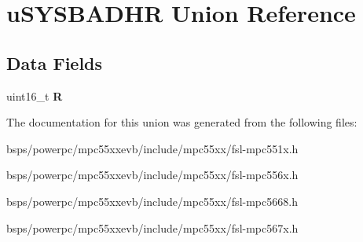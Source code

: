 \hypertarget{unionuSYSBADHR}{}\section{u\+S\+Y\+S\+B\+A\+D\+HR Union Reference}
\label{unionuSYSBADHR}
\subsection*{Data Fields}
\begin{DoxyCompactItemize}
\item 
\mbox{\label{unionuSYSBADHR_a69d4021a52468e3a05b10a9547989962}} 
uint16\+\_\+t {\bfseries R}
\end{DoxyCompactItemize}


The documentation for this union was generated from the following files\+:\begin{DoxyCompactItemize}
\item 
bsps/powerpc/mpc55xxevb/include/mpc55xx/fsl-\/mpc551x.\+h\item 
bsps/powerpc/mpc55xxevb/include/mpc55xx/fsl-\/mpc556x.\+h\item 
bsps/powerpc/mpc55xxevb/include/mpc55xx/fsl-\/mpc5668.\+h\item 
bsps/powerpc/mpc55xxevb/include/mpc55xx/fsl-\/mpc567x.\+h\end{DoxyCompactItemize}

